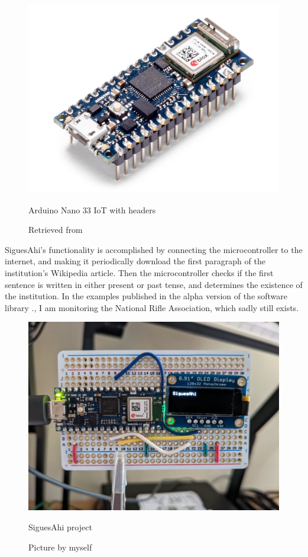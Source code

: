 \begin{figure}[ht]
  \centering
  \includegraphics[width=0.75\linewidth,height=0.20\textheight,keepaspectratio]{images/arduino-nano-33-iot-with-headers.jpg}
  \caption{Arduino Nano 33 IoT with headers}
  \caption*{Retrieved from \cite{website-arduino-nano-33-iot-with-headers}}
  \label{}
\end{figure}

SiguesAhi's functionality is accomplished by connecting the microcontroller to the internet, and making it periodically download the first paragraph of the institution's Wikipedia article. Then the microcontroller checks if the first sentence is written in either present or past tense, and determines the existence of the institution. In the examples published in the alpha version of the software library \cite{website-library-siguesahi}., I am monitoring the National Rifle Association, which sadly still exists. 

\begin{figure}[ht]
  \centering
  \includegraphics[width=0.75\linewidth,height=0.25\textheight,keepaspectratio]{images/siguesahi.jpg}
  \caption{SiguesAhi project}
  \caption*{Picture by myself}
  \label{fig:siguesahi}
\end{figure}

